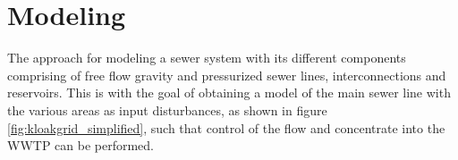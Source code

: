 \chapter{Modeling}\label{se:modeling}

The approach for modeling a sewer system with its different components comprising of free flow gravity and pressurized sewer lines, interconnections and reservoirs. This is with the goal of obtaining a model of the main sewer line with the various areas as input disturbances, as shown in figure \ref{fig:kloakgrid_simplified}, such that control of the flow and concentrate into the WWTP can be performed.







